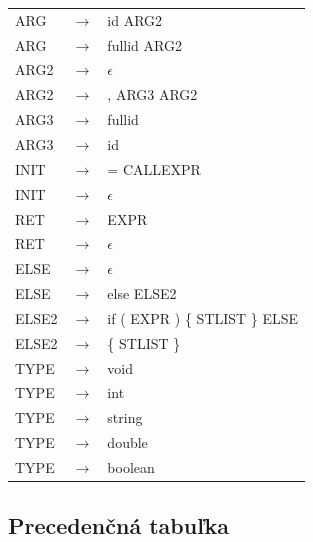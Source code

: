 \documentclass[11pt,a4paper]{article}
\begin{document}
\begin{tabular}{l c l}
		ARG &$\rightarrow$& id ARG2 \\
		ARG &$\rightarrow$& fullid ARG2 \\
		ARG2 &$\rightarrow$& $\epsilon$ \\
		ARG2 &$\rightarrow$& , ARG3 ARG2 \\
		ARG3 &$\rightarrow$& fullid \\
		ARG3 &$\rightarrow$& id \\
		INIT &$\rightarrow$& = CALLEXPR \\
		INIT &$\rightarrow$& $\epsilon$ \\
		RET &$\rightarrow$& EXPR \\
		RET &$\rightarrow$& $\epsilon$ \\
		ELSE &$\rightarrow$& $\epsilon$ \\
		ELSE &$\rightarrow$& else ELSE2 \\
		ELSE2 &$\rightarrow$& if ( EXPR ) \{ STLIST \} ELSE \\
		ELSE2 &$\rightarrow$& \{ STLIST \} \\
		TYPE &$\rightarrow$& void \\
		TYPE &$\rightarrow$& int \\
		TYPE &$\rightarrow$& string \\
		TYPE &$\rightarrow$& double \\
		TYPE &$\rightarrow$& boolean \\
	\end{tabular}


	\newpage
	\subsection{Precedenčná tabuľka}
	\label{tabulka}
\end{document}
